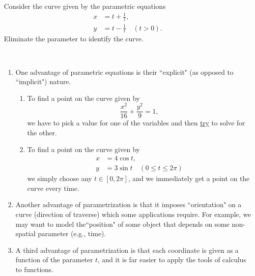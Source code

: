 \begin{example}
Consider the curve given by the parametric equations
\begin{align*}
x &= t + \frac{1}{t},\\
y &= t - \frac{1}{t} \quad (t>0).
\end{align*}
Eliminate the parameter to identify the curve.
\end{example}

\ifdefined\SOLUTION
{}
\fi

\newpage

\begin{remark}\,
\begin{enumerate}
\item One advantage of parametric equations is their ``explicit" (as opposed to ``implicit") nature.
\begin{enumerate}
\item To find a point on the curve given by 
\begin{equation*}
\frac{x^2}{16}+\frac{y^2}{9}=1,
\end{equation*}
we have to pick a value for one of the variables and then \underline{try} to solve for the other.
\item To find a point on the curve given by
\begin{align*}
x &=  4\cos t,\\
y &=  3\sin t\quad (0\le t\le 2\pi)
\end{align*}
we simply choose any $t\in [0,2\pi]$, and we immediately get a point on the curve every time.
\end{enumerate}
\item Another advantage of parametrization is that it imposes ``orientation" on a curve (direction of traverse) which some applications require.
For example, we may want to model the``position" of some object that depends on some non-spatial parameter (e.g., time).
\item A third advantage of parametrization is that each coordinate is given as a function of the parameter $t$, and it is far easier to apply the tools of calculus to functions.
\end{enumerate}
\end{remark}

